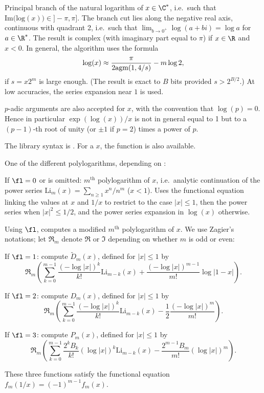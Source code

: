 \label{se:log}
Principal branch of the natural logarithm of
$x \in \C^*$, i.e.~such that $\text{Im(log}(x))\in{} ]-\pi,\pi]$.
The branch cut lies
along the negative real axis, continuous with quadrant 2, i.e.~such that
$\lim_{b\to 0^+} \log (a+bi) = \log a$ for $a \in\R^*$. The result is complex
(with imaginary part equal to $\pi$) if $x\in \R$ and $x < 0$. In general,
the algorithm uses the formula
$$\log(x) \approx {\pi\over 2\text{agm}(1, 4/s)} - m \log 2, $$
if $s = x 2^m$ is large enough. (The result is exact to $B$ bits provided
$s > 2^{B/2}$.) At low accuracies, the series expansion near $1$ is used.

$p$-adic arguments are also accepted for $x$, with the convention that
$\log(p)=0$. Hence in particular $\exp(\log(x))/x$ is not in general equal to
1 but to a $(p-1)$-th root of unity (or $\pm1$ if $p=2$) times a power of $p$.

The library syntax is .
For a  $x$, the function
 is also available.

\label{se:polylog}
One of the different polylogarithms, depending on \fl:

If $\fl=0$ or is omitted: $m^\text{th}$ polylogarithm of $x$, i.e.~analytic
continuation of the power series $\text{Li}_m(x)=\sum_{n\ge1}x^n/n^m$
($x < 1$). Uses the functional equation linking the values at $x$ and $1/x$
to restrict to the case $|x|\leq 1$, then the power series when
$|x|^2\le1/2$, and the power series expansion in $\log(x)$ otherwise.

Using $\fl$, computes a modified $m^\text{th}$ polylogarithm of $x$.
We use Zagier's notations; let $\Re_m$ denote $\Re$ or $\Im$ depending
on whether $m$ is odd or even:

If $\fl=1$: compute $\tilde D_m(x)$, defined for $|x|\le1$ by
$$\Re_m\left(\sum_{k=0}^{m-1} \dfrac{(-\log|x|)^k}{k!}\text{Li}_{m-k}(x)
+\dfrac{(-\log|x|)^{m-1}}{m!}\log|1-x|\right).$$

If $\fl=2$: compute $D_m(x)$, defined for $|x|\le1$ by
$$\Re_m\left(\sum_{k=0}^{m-1}\dfrac{(-\log|x|)^k}{k!}\text{Li}_{m-k}(x)
-\dfrac{1}{2}\dfrac{(-\log|x|)^m}{m!}\right).$$

If $\fl=3$: compute $P_m(x)$, defined for $|x|\le1$ by
$$\Re_m\left(\sum_{k=0}^{m-1}\dfrac{2^kB_k}{k!}(\log|x|)^k\text{Li}_{m-k}(x)
-\dfrac{2^{m-1}B_m}{m!}(\log|x|)^m\right).$$

These three functions satisfy the functional equation
$f_m(1/x) = (-1)^{m-1}f_m(x)$.

